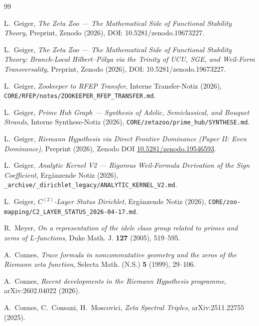 \documentclass[11pt,a4paper]{article}
\theoremstyle{plain}
\theoremstyle{definition}
\begin{document}
\begin{thebibliography}{99}

L.~Geiger,
\textit{The Zeta Zoo --- The Mathematical Side of Functional
Stability Theory},
Preprint, Zenodo (2026), DOI: 10.5281/zenodo.19673227.

L.~Geiger,
\textit{The Zeta Zoo --- The Mathematical Side of Functional
Stability Theory: Branch-Local Hilbert--P\'olya via the Trinity of
UCU, SGE, and Weil-Form Transversality},
Preprint, Zenodo (2026), DOI: 10.5281/zenodo.19673227.


L.~Geiger,
\textit{Zookeeper to RFEP Transfer},
Interne Transfer-Notiz (2026),
  \texttt{CORE/RFEP/notes/ZOOKEEPER\_RFEP\_TRANSFER.md}.

L.~Geiger,
\textit{Prime Hub Graph --- Synthesis of Adelic, Semiclassical,
and Bouquet Strands},
Interne Synthese-Notiz (2026),
\texttt{CORE/zetazoo/prime\_hub/SYNTHESE.md}.

L.~Geiger,
\textit{Riemann Hypothesis via Direct Frontier Dominance
(Paper II: Even Dominance)},
Preprint (2026),
Zenodo DOI \href{https://doi.org/10.5281/zenodo.19546593}{10.5281/zenodo.19546593}.

L.~Geiger,
\textit{Analytic Kernel V2 --- Rigorous Weil-Formula Derivation
of the Sign Coefficient},
Ergänzende Notiz (2026),
\texttt{\_archive/\_dirichlet\_legacy/ANALYTIC\_KERNEL\_V2.md}.

L.~Geiger,
\textit{$C^{(2)}$-Layer Status Dirichlet},
Ergänzende Notiz (2026),
\texttt{CORE/zoo-mapping/C2\_LAYER\_STATUS\_2026-04-17.md}.

R.~Meyer,
\textit{On a representation of the idele class group related to
primes and zeros of $L$-functions},
Duke Math. J. \textbf{127} (2005), 519--595.

A.~Connes,
\textit{Trace formula in noncommutative geometry and the zeros of
the Riemann zeta function},
Selecta Math. (N.S.) \textbf{5} (1999), 29--106.

A.~Connes,
\textit{Recent developments in the Riemann Hypothesis programme},
arXiv:2602.04022 (2026).

A.~Connes, C.~Consani, H.~Moscovici,
\textit{Zeta Spectral Triples},
arXiv:2511.22755 (2025).


\end{thebibliography}
\end{document}
